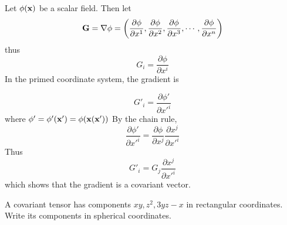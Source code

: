 \begin{solu}
Let $\phi(\mathbf{ x})$ be a scalar field.  Then let
\[ \mathbf{ G} = \nabla\phi = \left(\frac{\partial\phi}{\partial x^1}, \frac{\partial\phi}{\partial x^2},\frac{\partial\phi}{\partial x^3},\cdots,\frac{\partial\phi}{\partial x^n}\right)\]
thus
\[ G_i = \frac{\partial \phi}{\partial x^i}\]
In the primed coordinate system, the gradient is

 \[G'_i = \frac{\partial \phi'}{\partial x'^i}\]
where $\phi'=\phi'(\mathbf{ x}')=\phi(\mathbf{ x}(\mathbf{ x}'))$
By the chain rule,
\[\frac{\partial\phi'}{\partial x'^i}=\frac{\partial\phi}{\partial x^j}\frac{\partial x^j}{\partial x'^i}\]
Thus
\[G'_i=G_j\frac{\partial x^j}{\partial x'^i}\]
which shows that the gradient is a covariant vector.
 
\end{solu}



\begin{example}
 A covariant tensor has components $xy,z^2, 3yz-x$ in rectangular coordinates. Write its components in spherical coordinates.
\end{example}


